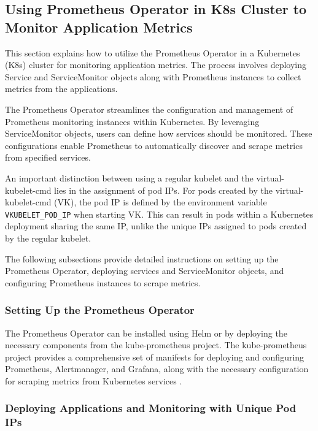\subsection{Using Prometheus Operator in K8s Cluster to Monitor Application Metrics}
\label{prometheus-operator}

This section explains how to utilize the Prometheus Operator in a Kubernetes (K8s) cluster for monitoring application metrics. The process involves deploying Service and ServiceMonitor objects along with Prometheus instances to collect metrics from the applications.

The Prometheus Operator streamlines the configuration and management of Prometheus monitoring instances within Kubernetes. By leveraging ServiceMonitor objects, users can define how services should be monitored. These configurations enable Prometheus to automatically discover and scrape metrics from specified services.

An important distinction between using a regular kubelet and the virtual-kubelet-cmd lies in the assignment of pod IPs. For pods created by the virtual-kubelet-cmd (VK), the pod IP is defined by the environment variable \texttt{VKUBELET\_POD\_IP} when starting VK. This can result in pods within a Kubernetes deployment sharing the same IP, unlike the unique IPs assigned to pods created by the regular kubelet.

The following subsections provide detailed instructions on setting up the Prometheus Operator, deploying services and ServiceMonitor objects, and configuring Prometheus instances to scrape metrics.

\subsubsection{Setting Up the Prometheus Operator}

The Prometheus Operator can be installed using Helm or by deploying the necessary components from the kube-prometheus project. The kube-prometheus project provides a comprehensive set of manifests for deploying and configuring Prometheus, Alertmanager, and Grafana, along with the necessary configuration for scraping metrics from Kubernetes services \cite{kube-prometheus}.

\subsubsection{Deploying Applications and Monitoring with Unique Pod IPs}


